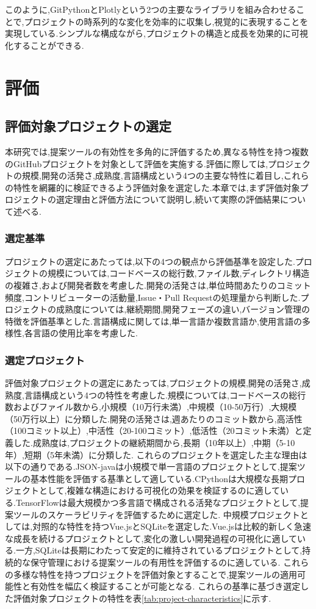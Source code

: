 \documentclass[12pt,twoside]{jbook}
\begin{document}
このように,GitPythonとPlotlyという2つの主要なライブラリを組み合わせることで,プロジェクトの時系列的な変化を効率的に収集し,視覚的に表現することを実現している.シンプルな構成ながら,プロジェクトの構造と成長を効果的に可視化することができる.

\chapter{評価}

\section{評価対象プロジェクトの選定}
本研究では,提案ツールの有効性を多角的に評価するため,異なる特性を持つ複数のGitHubプロジェクトを対象として評価を実施する.評価に際しては,プロジェクトの規模,開発の活発さ,成熟度,言語構成という4つの主要な特性に着目し,これらの特性を網羅的に検証できるよう評価対象を選定した.本章では,まず評価対象プロジェクトの選定理由と評価方法について説明し,続いて実際の評価結果について述べる.

\subsection{選定基準}
プロジェクトの選定にあたっては,以下の4つの観点から評価基準を設定した.プロジェクトの規模については,コードベースの総行数,ファイル数,ディレクトリ構造の複雑さ,および開発者数を考慮した.開発の活発さは,単位時間あたりのコミット頻度,コントリビューターの活動量,Issue・Pull Requestの処理量から判断した.プロジェクトの成熟度については,継続期間,開発フェーズの違い,バージョン管理の特徴を評価基準とした.言語構成に関しては,単一言語か複数言語か,使用言語の多様性,各言語の使用比率を考慮した.

\subsection{選定プロジェクト}
評価対象プロジェクトの選定にあたっては,プロジェクトの規模,開発の活発さ,成熟度,言語構成という4つの特性を考慮した.規模については,コードベースの総行数およびファイル数から,小規模（10万行未満）,中規模（10-50万行）,大規模（50万行以上）に分類した.開発の活発さは,週あたりのコミット数から,高活性（100コミット以上）,中活性（20-100コミット）,低活性（20コミット未満）と定義した.成熟度は,プロジェクトの継続期間から,長期（10年以上）,中期（5-10年）,短期（5年未満）に分類した.
これらのプロジェクトを選定した主な理由は以下の通りである.JSON-javaは小規模で単一言語のプロジェクトとして,提案ツールの基本性能を評価する基準として適している.CPythonは大規模な長期プロジェクトとして,複雑な構造における可視化の効果を検証するのに適している.TensorFlowは最大規模かつ多言語で構成される活発なプロジェクトとして,提案ツールのスケーラビリティを評価するために選定した.
中規模プロジェクトとしては,対照的な特性を持つVue.jsとSQLiteを選定した.Vue.jsは比較的新しく急速な成長を続けるプロジェクトとして,変化の激しい開発過程の可視化に適している.一方,SQLiteは長期にわたって安定的に維持されているプロジェクトとして,持続的な保守管理における提案ツールの有用性を評価するのに適している.
これらの多様な特性を持つプロジェクトを評価対象とすることで,提案ツールの適用可能性と有効性を幅広く検証することが可能となる.
これらの基準に基づき選定した評価対象プロジェクトの特性を表\ref{tab:project-characteristics}に示す.
\end{document}
